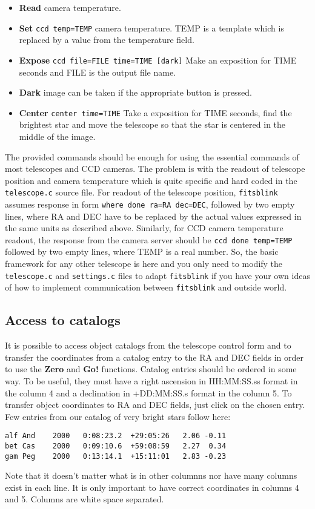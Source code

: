 \documentclass[11pt]{article}
\begin{document}
\begin{itemize}
\item \textbf{Read} camera temperature.
\item \textbf{Set} {\verb+ccd temp=TEMP+} camera temperature.  TEMP
is a template which is replaced by a value from the temperature field.
\item \textbf{Expose} {\verb+ccd file=FILE time=TIME [dark]+}  Make
an exposition for TIME seconds and FILE is the output file name.
\item \textbf{Dark} image can be taken if the appropriate button is
pressed.
\item \textbf{Center} {\verb+center time=TIME+} Take a exposition for
TIME seconds, find the brightest star and move the telescope so that
the star is centered in the middle of the image.
\end{itemize}

The provided commands should be enough for using the essential
commands of most telescopes and CCD cameras.  The problem is with the
readout of telescope position and camera temperature which is quite
specific and hard coded in the \verb=telescope.c= source file.  For
readout of the telescope position, \verb=fitsblink= assumes response
in form \verb+where done ra=RA dec=DEC+, followed by two empty lines,
where RA and DEC have to be replaced by the actual values expressed in
the same units as described above.  Similarly, for CCD camera
temperature readout, the response from the camera server should be
\verb+ccd done temp=TEMP+ followed by two empty lines, where TEMP is a
real number.  So, the basic framework for any other telescope is here
and you only need to modify the \verb=telescope.c= and
\verb=settings.c= files to adapt \verb=fitsblink= if you have your own
ideas of how to implement communication between \verb=fitsblink= and
outside world.

\subsection{Access to catalogs}

It is possible to access object catalogs from the telescope control
form and to transfer the coordinates from a catalog entry to the RA
and DEC fields in order to use the \textbf{Zero} and \textbf{Go!}
functions.  Catalog entries should be ordered in some way.  To be
useful, they must have a right ascension in HH:MM:SS.ss format in
the column 4 and a declination in +DD:MM:SS.s format in the column 5.
To transfer object coordinates to RA and DEC fields, just click on the
chosen entry.  Few entries from our catalog of very bright stars
follow here:

\begin{verbatim}
alf And    2000   0:08:23.2  +29:05:26   2.06 -0.11
bet Cas    2000   0:09:10.6  +59:08:59   2.27  0.34
gam Peg    2000   0:13:14.1  +15:11:01   2.83 -0.23
\end{verbatim}
Note that it doesn't matter what is in other columnns nor have many
columns exist in each line.  It is only important to have correct
coordinates in columns 4 and 5.  Columns are white space separated.
\end{document}
